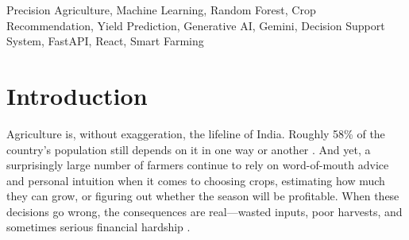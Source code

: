 \documentclass[conference]{IEEEtran}
\begin{document}
\begin{abstract}
Farming has always been central to the Indian economy, but many farmers still make key decisions---like which crop to grow or how much yield to expect---based mostly on past experience rather than data. In this paper, we present AgriSense, a web-based platform that brings together machine learning and generative AI to help farmers make better-informed choices. On the ML side, we use a Random Forest Classifier that takes in soil and weather data (nitrogen, phosphorus, potassium, temperature, humidity, pH, and rainfall) and returns the top three most suitable crops along with confidence scores. For yield estimation, a Random Forest Regressor---wrapped inside a scikit-learn pipeline with One-Hot Encoding for categorical inputs like crop name, season, and state---predicts the expected harvest given the field area, rainfall, fertilizer, and pesticide usage. Beyond these core predictions, the platform also offers profit estimation, a rule-based risk indicator, and a side-by-side crop profitability comparison tool. What sets AgriSense apart is the integration of Google Gemini 2.5 Flash: after every prediction, users can request an AI-generated explanation written in plain language, so the numbers actually make sense to someone without a technical background. The whole system runs on a FastAPI back-end paired with a React and Vite front-end, with Recharts powering the interactive charts. We tested it on publicly available agricultural datasets and found the results to be quite promising.
\end{abstract}

\begin{IEEEkeywords}
Precision Agriculture, Machine Learning, Random Forest, Crop Recommendation, Yield Prediction, Generative AI, Gemini, Decision Support System, FastAPI, React, Smart Farming
\end{IEEEkeywords}

\section{Introduction}

Agriculture is, without exaggeration, the lifeline of India. Roughly 58\% of the country's population still depends on it in one way or another \cite{fao2023}. And yet, a surprisingly large number of farmers continue to rely on word-of-mouth advice and personal intuition when it comes to choosing crops, estimating how much they can grow, or figuring out whether the season will be profitable. When these decisions go wrong, the consequences are real---wasted inputs, poor harvests, and sometimes serious financial hardship \cite{liakos2018}.
\end{document}

